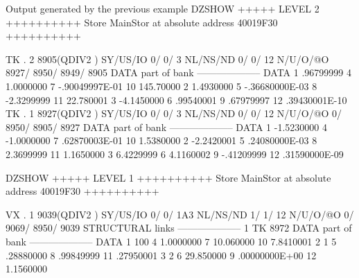 \begin{Listing}{Output generated by the previous example}
DZSHOW  +++++ LEVEL     2 ++++++++++            Store  MainStor at absolute address 40019F30      ++++++++++                     
                                                                                                                                 
 TK  .     2     8905(QDIV2   ) SY/US/IO    0/    0/   3 NL/NS/ND    0/    0/      12 N/U/O/@O    8927/    8950/    8949/    8905
DATA part of bank                                         --------------------                                                   
DATA      1     .96799999         4     1.0000000         7    -.90049997E-01    10     145.70000                                
          2     1.4930000         5    -.36680000E-03     8    -2.3299999        11     22.780001                                
          3    -4.1450000         6     .99540001         9     .67979997        12     .39430001E-10                            
 TK  .     1     8927(QDIV2   ) SY/US/IO    0/    0/   3 NL/NS/ND    0/    0/      12 N/U/O/@O       0/    8950/    8905/    8927
DATA part of bank                                         --------------------                                                   
DATA      1    -1.5230000         4    -1.0000000         7     .62870003E-01    10     1.5380000                                
          2    -2.2420001         5     .24080000E-03     8     2.3699999        11     1.1650000                                
          3     6.4229999         6     4.1160002         9    -.41209999        12     .31590000E-09                            
                                                                                                                                 
DZSHOW  +++++ LEVEL     1 ++++++++++            Store  MainStor at absolute address 40019F30      ++++++++++                     
                                                                                                                                 
 VX  .     1     9039(QDIV2   ) SY/US/IO    0/    0/ 1A3 NL/NS/ND    1/    1/      12 N/U/O/@O       0/    9069/    8950/    9039
STRUCTURAL links                                          --------------------                                                   
          1    TK        8972                                                                                                    
DATA part of bank                                         --------------------                                                   
DATA      1               100     4     1.0000000         7     10.060000        10     7.8410001                                
          2                 1     5     .28880000         8     .99849999        11     .27950001                                
          3                 2     6     29.850000         9     .00000000E+00    12     1.1560000                                
                                                                                                                                 

\end{Listing}
